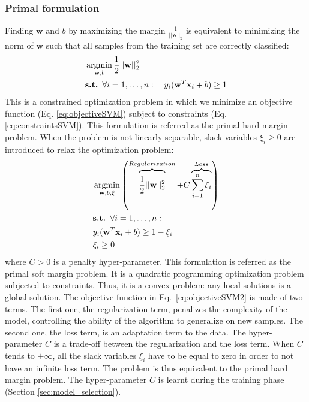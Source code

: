 \subsubsection{Primal formulation}
Finding $\textbf{w}$ and $b$ by maximizing the margin $\frac{1}{||\textbf{w}||_2}$ is equivalent to minimizing the norm of $\textbf{w}$ such that all samples from the training set are correctly classified:
	\begin{align}
		& \argmin_{\textbf{w},b} \frac{1}{2} ||\textbf{w}||_2^2 \label{eq:objectiveSVM}\\
		& \textbf{s.t. } \forall i = 1,\ldots,n: \quad y_i(\textbf{w} ^T\textbf{x}_i+b) \geq 1 \label{eq:constraintsSVM}
	\end{align}
This is a constrained optimization problem in which we minimize an objective function (Eq. \ref{eq:objectiveSVM}) subject to constraints (Eq. \ref{eq:constraintsSVM}). This formulation is referred as the primal hard margin problem. When the problem is not linearly separable, slack variables $\xi_i \geq 0$ are introduced to relax the optimization problem:
	\begin{align}
	& \argmin_{\textbf{w},b, \xi}  
	\left( 
	\overbrace{\vphantom{\sum_{i=1}^n \xi_i}
		\frac{1}{2}||\textbf{w}||^2_2}^{Regularization}
	+ C \overbrace{\sum\limits_{i=1}^{n}\xi_i}^{Loss} \right) 
	\label{eq:objectiveSVM2}\\
	& \textbf{s.t. } \forall i = 1,\ldots,n: \nonumber \\
	& y_i(\textbf{w}^T\textbf{x}_i+b) \geq 1 -\xi_i \label{eq:constraintsSVM2} \\
	&  \xi_i \geq 0 \label{eq:constraintsSVM20}
	\end{align}
\noindent where $C > 0$ is a penalty hyper-parameter. This formulation is referred as the primal soft margin problem. It is a quadratic programming optimization problem subjected to constraints. Thus, it is a convex problem: any local solutions is a global solution. The objective function in Eq.~\ref{eq:objectiveSVM2} is made of two terms. The first one, the regularization term, penalizes the complexity of the model, controlling the ability of the algorithm to generalize on new samples. The second one, the loss term, is an adaptation term to the data. The hyper-parameter $C$ is a trade-off between the regularization and the loss term. When $C$ tends to $+\infty$, all the slack variables $\xi_i$ have to be equal to zero in order to not have an infinite loss term. The problem is thus equivalent to the primal hard margin problem. The hyper-parameter $C$ is learnt during the training phase (Section \ref{sec:model_selection}). 


